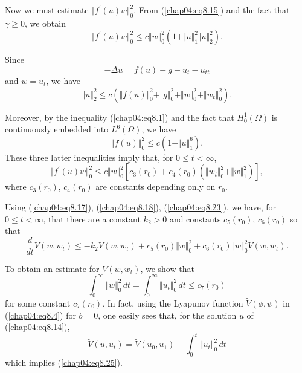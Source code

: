 \documentclass{surv-l}
\theoremstyle{plain}
\theoremstyle{definition}
\numberwithin{equation}{section}
\numberwithin{figure}{chapter}
\begin{document}
Now we must estimate $\Vert f^{\prime}(u)w\Vert_{0}^{2}$. From (\ref{chap04:eq8.15}) and the fact that $\gamma\geq 0$, we obtain
\begin{equation}\label{chap04:eq8.19}
\Vert f^{\prime}(u)w\Vert_{0}^{2}\leq c\Vert w\Vert_{0}^{2}(1+\Vert u\Vert_{1}^{2}\Vert u\Vert_{2}^{2}).
\end{equation}

Since
\begin{equation}\label{chap04:eq8.20}
-\Delta u=f(u)-g-u_{t}-u_{tt}
\end{equation}
and $w=u_{t}$, we have
\begin{equation}\label{chap04:eq8.21}
\Vert u\Vert_{2}^{2}\leq c(\Vert f(u)\Vert_{0}^{2}+\Vert g\Vert_{0}^{2}+\Vert w\Vert_{0}^{2}+\Vert w_{t}\Vert_{0}^{2}).
\end{equation}

Moreover, by the inequality (\ref{chap04:eq8.1}) and the fact that $H_{0}^{1}(\Omega)$ is continuously embedded into $L^{6}(\Omega)$, we have
\begin{equation}\label{chap04:eq8.22}
\Vert f(u)\Vert_{0}^{2}\leq c(1+\Vert u\Vert_{1}^{6}).
\end{equation}
These three latter inequalities imply that, for $ 0\leq t<\infty$,
\begin{equation}\label{chap04:eq8.23}
\Vert f^{\prime}(u)w\Vert_{0}^{2}\leq c\Vert w\Vert_{0}^{2}[c_{3}(r_{0})+c_{4}(r_{0})(\Vert w_{t}\Vert_{0}^{2}+\Vert w\Vert_{1}^{2})],
\end{equation}
where $c_{3}(r_{0})$, $c_{4}(r_{0})$ are constants depending only on $r_{0}$.

Using (\ref{chap04:eq8.17}), (\ref{chap04:eq8.18}), (\ref{chap04:eq8.23}), we have, for $ 0\leq t<\infty$, that there are a constant $k_{2}>0$ and constants $c_{5}(r_{0})$, $c_{6}(r_{0})$ so that
\begin{equation}\label{chap04:eq8.24}
\frac{d}{dt}V(w, w_{t})\leq-k_{2}V(w, w_{t})+c_{5}(r_{0})\Vert w\Vert_{0}^{2}+c_{6}(r_{0})\Vert w\Vert_{0}^{2}V(w, w_{t}).
\end{equation}

To obtain an estimate for $V(w, w_{t})$, we show that
\begin{equation}\label{chap04:eq8.25}
\int_{0}^{\infty}\Vert w\Vert_{0}^{2}\,dt=\int_{0}^{\infty}\Vert u_{t}\Vert_{0}^{2}\,dt\leq c_{7}(r_{0})
\end{equation}
for some constant $c_{7}(r_{0})$. In fact, using the Lyapunov function $\tilde{V}(\phi, \psi)$ in (\ref{chap04:eq8.4})
for $b=0$, one easily sees that, for the solution $u$ of (\ref{chap04:eq8.14}),
\begin{equation*}
\tilde{V}(u, u_{t})=\tilde{V}(u_{0}, u_{1})-\int_{0}^{t}\Vert u_{t}\Vert_{0}^{2}\,dt
\end{equation*}
which implies (\ref{chap04:eq8.25}).
\end{document}
